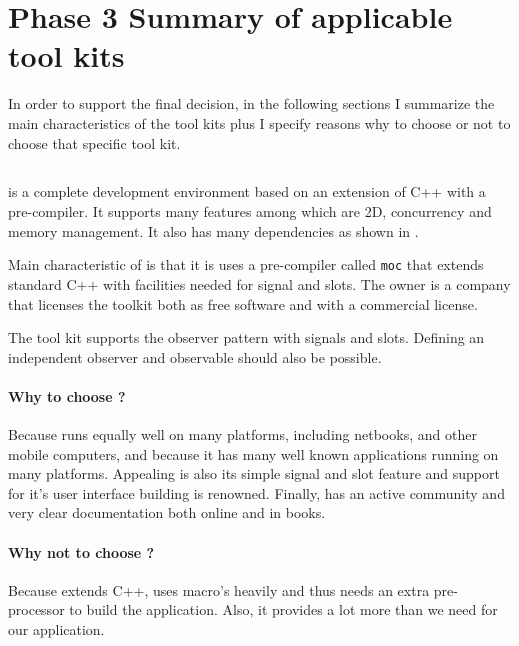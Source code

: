 \section{Phase 3 Summary of applicable tool kits}
\label{sec:phase3listing}

In order to support the final decision, in the following sections I summarize
the main characteristics of the tool kits plus I specify reasons why to choose
or not to choose that specific tool kit.

\subsection{} 

 is a complete development environment based on an extension of C++ with
a  pre-compiler. It supports many features among which are 2D,
concurrency and memory management. It also has many dependencies as shown in
\cite{qt:qt-dep}.

Main characteristic of  is that it is uses a pre-compiler called
\texttt{moc} that extends standard C++ with facilities needed for signal and
slots. The owner is a company  that licenses the  toolkit both
as free software and with a commercial license.

The tool kit  supports the observer pattern with signals and slots.
Defining an independent observer and observable should also be possible.

\paragraph{Why to choose ?} Because  runs equally well on many
platforms, including netbooks, and other mobile computers, and because it has
many well known applications running on many platforms. Appealing is also its
simple signal and slot feature and support for it's user interface building is
renowned.  Finally,  has an active community and very clear documentation
both online and in books. 

\paragraph{Why not to choose ?} Because  extends C++, uses macro's
heavily and thus needs an extra pre-processor to build the application. Also,
it provides a lot more than we need for our application. 

\subsection{}

